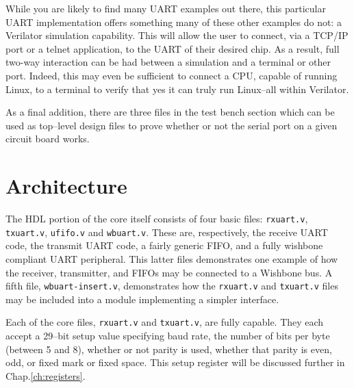\documentclass{gqtekspec}
\begin{document}

While you are likely to find many UART examples out there, this particular
UART implementation offers something many of these other examples do not: a
Verilator simulation capability.  This will allow the user to connect, via
a TCP/IP port or a telnet application, to the UART of their desired chip.  As
a result, full two-way interaction can be had between a simulation and a
terminal or other port.  Indeed, this may even be sufficient to connect a 
CPU, capable of running Linux, to a terminal to verify that yes it can truly
run Linux--all within Verilator.

As a final addition, there are three files in the test bench section which can
be used as top--level design files to prove whether or not the serial port on
a given circuit board works.

\chapter{Architecture}\label{ch:arch}

The HDL portion of the core itself consists of four basic files: {\tt rxuart.v},
{\tt txuart.v}, {\tt ufifo.v} and {\tt wbuart.v}.  These are, respectively, the
receive UART code, the transmit UART code, a fairly generic FIFO, and a fully
wishbone compliant UART peripheral.  This latter files demonstrates one example
of how the receiver, transmitter, and FIFOs may be connected to a Wishbone bus.
A fifth file, {\tt wbuart-insert.v}, demonstrates how the {\tt rxuart.v} and
{\tt txuart.v} files may be included into a module implementing a simpler
interface.

Each of the core files, {\tt rxuart.v} and {\tt txuart.v}, are fully capable.
They each accept a 29--bit setup value specifying baud rate, the number of bits
per byte (between 5 and 8), whether or not parity is used, whether that parity
is even, odd, or fixed mark or fixed space.  This setup register will be
discussed further in Chap.\ref{ch:registers}.
\end{document}
